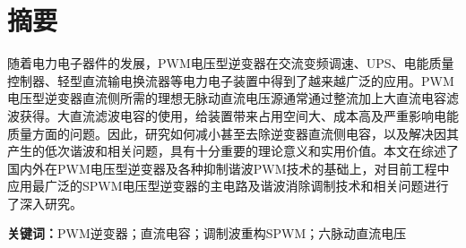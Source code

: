 \thispagestyle{fancy}
\fancyhf{}
\fancyfoot[C]{\thepage}
\section*{摘\quad 要}
\vspace{0.5cm}
\begin{spacing}{1.5}
\large{
随着电力电子器件的发展，PWM电压型逆变器在交流变频调速、UPS、电能质量控制器、轻型直流输电换流器等电力电子装置中得到了越来越广泛的应用。PWM电压型逆变器直流侧所需的理想无脉动直流电压源通常通过整流加上大直流电容滤波获得。大直流滤波电容的使用，给装置带来占用空间大、成本高及严重影响电能质量方面的问题。因此，研究如何减小甚至去除逆变器直流侧电容，以及解决因其产生的低次谐波和相关问题，具有十分重要的理论意义和实用价值。本文在综述了国内外在PWM电压型逆变器及各种抑制谐波PWM技术的基础上，对目前工程中应用最广泛的SPWM电压型逆变器的主电路及谐波消除调制技术和相关问题进行了深入研究。}
\vspace{1em}
\par
\noindent \textbf{关键词：}PWM逆变器；直流电容；调制波重构SPWM；六脉动直流电压
\end{spacing}

